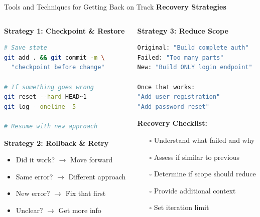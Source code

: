 \documentclass[aspectratio=169,11pt]{beamer}
\begin{document}
\begin{frame}[fragile]{Tools and Techniques for Getting Back on Track}
    \textbf{Recovery Strategies}

    \begin{columns}[T]
        \begin{column}{0.48\textwidth}
            \textbf{Strategy 1: Checkpoint \& Restore}
            \begin{lstlisting}[language=Bash]
# Save state
git add . && git commit -m \
  "checkpoint before change"

# If something goes wrong
git reset --hard HEAD~1
git log --oneline -5

# Resume with new approach
            \end{lstlisting}

            \textbf{Strategy 2: Rollback \& Retry}
            \begin{itemize}
                \item Did it work? $\rightarrow$ Move forward
                \item Same error? $\rightarrow$ Different approach
                \item New error? $\rightarrow$ Fix that first
                \item Unclear? $\rightarrow$ Get more info
            \end{itemize}
        \end{column}
        \begin{column}{0.48\textwidth}
            \textbf{Strategy 3: Reduce Scope}
            \begin{lstlisting}[language=Bash]
Original: "Build complete auth"
Failed: "Too many parts"
New: "Build ONLY login endpoint"

Once that works:
"Add user registration"
"Add password reset"
            \end{lstlisting}

            \textbf{Recovery Checklist:}
            \begin{itemize}
                \item[$\square$] Understand what failed and why
                \item[$\square$] Assess if similar to previous
                \item[$\square$] Determine if scope should reduce
                \item[$\square$] Provide additional context
                \item[$\square$] Set iteration limit
            \end{itemize}
        \end{column}
    \end{columns}
\end{frame}
\end{document}

